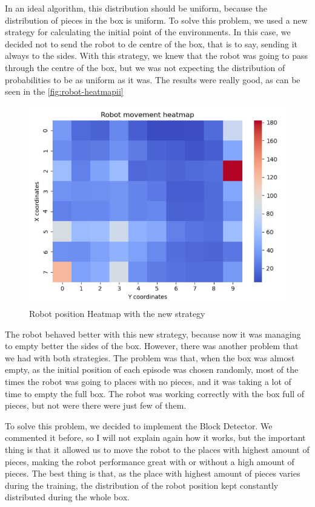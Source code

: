 			In an ideal algorithm, this distribution should be uniform, because the distribution of pieces in the box is uniform. To solve this problem, we used a new strategy for calculating the initial point of the environments. In this case, we decided not to send the robot to de centre of the box, that is to say, sending it always to the sides. With this strategy, we knew that the robot was going to pass through the centre of the box, but we was not expecting the distribution of probabilities to be as uniform as it was. The results were really good, as can be seen in the \autoref{fig:robot-heatmapii}
		
			\begin{figure}[H]
				\centering
				\includegraphics[width=0.9\linewidth]{"Images/Robot HeatmapII"}
				\caption[Heatmap robot II]{Robot position Heatmap with the new strategy}
				\label{fig:robot-heatmapii}
			\end{figure}
		
			The robot behaved better with this new strategy, because now it was managing to empty better the sides of the box. However, there was another problem that we had with both strategies. The problem was that, when the box was almost empty, as the initial position of each episode was chosen randomly, most of the times the robot was going to places with no pieces, and it was taking a lot of time to empty the full box. The robot was working correctly with the box full of pieces, but not were there were just few of them.
			
			To solve this problem, we decided to implement the Block Detector. We commented it before, so I will not explain again how it works, but the important thing is that it allowed us to move the robot to the places with highest amount of pieces, making the robot performance great with or without a high amount of pieces. The best thing is that, as the place with highest amount of pieces varies during the training, the distribution of the robot position kept constantly distributed during the whole box.
			
		
		
		
			
			
				
				
			
				